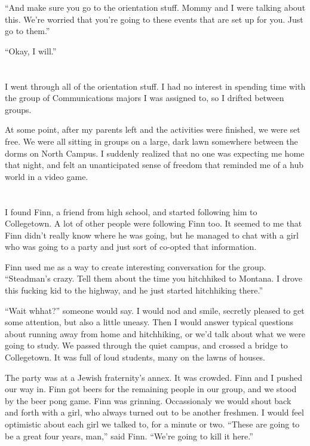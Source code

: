 ``And make sure you go to the orientation stuff.  Mommy and I were talking about
this.  We're worried that you're going to these events that are set up for you.
Just go to them.''

``Okay, I will.''

\section{}

I went through all of the orientation stuff.  I had no interest in spending
time with the group of Communications majors I was assigned to, so I drifted
between groups. 

At some point, after my parents left and the activities were finished, we were
set free.  We were all sitting in groups on a large, dark lawn somewhere between
the dorms on North Campus.  I suddenly realized that no one was expecting me
home that night, and felt an unanticipated sense of freedom that reminded me of
a hub world in a video game.

\section{}

I found Finn, a friend from high school, and started following him to
Collegetown.  A lot of other people were following Finn too.  It seemed to me
that Finn didn't really know where he was going, but he managed to chat with a
girl who was going to a party and just sort of co-opted that information.  

Finn used me as a way to create interesting conversation for the group.
``Steadman's crazy.  Tell them about the time you hitchhiked to Montana.  I
drove this fucking kid to the highway, and he just started hitchhiking there.''

``Wait whhat?'' someone would say.  I would nod and smile, secretly pleased to
get some attention, but also a little uneasy.  Then I would answer typical
questions about running away from home and hitchhiking, or we'd talk about what
we were going to study.  We passed through the quiet campus, and crossed a
bridge to Collegetown.  It was full of loud students, many on the lawns of
houses.

The party was at a Jewish fraternity's annex.  It was crowded.  Finn and I
pushed our way in.  Finn got beers for the remaining people in our group, and we
stood by the beer pong game.  Finn was grinning.  Occassionaly we would shout
back and forth with a girl, who always turned out to be another freshmen.  I
would feel optimistic about each girl we talked to, for a minute or two.
``These are going to be a great four years, man,'' said Finn.  ``We're going to
kill it here.''

